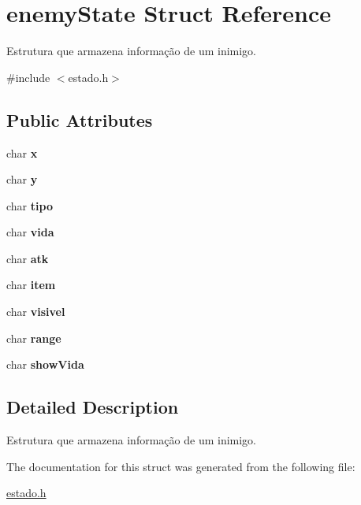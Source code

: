 \hypertarget{structenemyState}{}\section{enemy\+State Struct Reference}
\label{structenemyState}


Estrutura que armazena informação de um inimigo.  




{\ttfamily \#include $<$estado.\+h$>$}

\subsection*{Public Attributes}
\begin{DoxyCompactItemize}
\item 
char {\bfseries x}\hypertarget{structenemyState_ae6d5cfa384a78098cdf23ec69589b10d}{}\label{structenemyState_ae6d5cfa384a78098cdf23ec69589b10d}

\item 
char {\bfseries y}\hypertarget{structenemyState_a2173ca740a59463ead0c936a3241d761}{}\label{structenemyState_a2173ca740a59463ead0c936a3241d761}

\item 
char {\bfseries tipo}\hypertarget{structenemyState_ae500364f73acf0a77bd27079939370d5}{}\label{structenemyState_ae500364f73acf0a77bd27079939370d5}

\item 
char {\bfseries vida}\hypertarget{structenemyState_af5fe146ba8b66619c76393c93fa86b11}{}\label{structenemyState_af5fe146ba8b66619c76393c93fa86b11}

\item 
char {\bfseries atk}\hypertarget{structenemyState_a6a59304ef3b76ce826a9e587daf9b2ac}{}\label{structenemyState_a6a59304ef3b76ce826a9e587daf9b2ac}

\item 
char {\bfseries item}\hypertarget{structenemyState_a493e9483fc3aa2c07a83985442e77fce}{}\label{structenemyState_a493e9483fc3aa2c07a83985442e77fce}

\item 
char {\bfseries visivel}\hypertarget{structenemyState_a41fbd878c434babf902b1cb0378fac0e}{}\label{structenemyState_a41fbd878c434babf902b1cb0378fac0e}

\item 
char {\bfseries range}\hypertarget{structenemyState_a6ca2db93b244d4ffa467cdb5137cd107}{}\label{structenemyState_a6ca2db93b244d4ffa467cdb5137cd107}

\item 
char {\bfseries show\+Vida}\hypertarget{structenemyState_ac0c2c24945f8bb8edf25e040e2207acb}{}\label{structenemyState_ac0c2c24945f8bb8edf25e040e2207acb}

\end{DoxyCompactItemize}


\subsection{Detailed Description}
Estrutura que armazena informação de um inimigo. 

The documentation for this struct was generated from the following file\+:\begin{DoxyCompactItemize}
\item 
\hyperlink{estado_8h}{estado.\+h}\end{DoxyCompactItemize}

